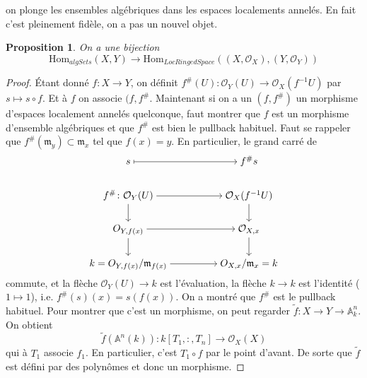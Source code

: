 \documentclass[a4paper,12pt]{book}
\newcommand{\A}{\mathbb{A}}
\newcommand{\Or}{\mathcal{O}}
\newcommand{\Hom}{\textrm{Hom}}
\newcommand{\m}{\mathfrak{m}}
\theoremstyle{plain}
\newtheorem{prop}[subsection]{Proposition}
\theoremstyle{definition}
\theoremstyle{remark}
\begin{document}
on plonge les ensembles algébriques dans les espaces localements
annelés. En fait c'est pleinement fidèle, on a pas un nouvel objet.
\begin{prop}
    On a une bijection 
    \[\Hom_{algSets}(X,Y)\to \Hom_{LocRingedSpace}((X,\Or_X),(Y,\Or_Y))\]
\end{prop}
\begin{proof}
    Étant donné $f\colon X\to Y$, on définit 
    $f^{\#}(U)\colon \Or_Y(U)\to \Or_X(f^{-1}U)$ par $s\mapsto s\circ f$.
    Et à $f$ on associe $(f,f^{\#}$. Maintenant si on a un $(f,f^{\#})$
    un morphisme d'espaces localement annelés quelconque, faut montrer
    que $f$ est un morphisme d'ensemble 
    algébriques et que $f^{\#}$ est bien le pullback habituel. Faut
    se rappeler que $f^{\#}(\m_y)\subset \m_x$ tel que $f(x)=y$. En 
    particulier, le grand carré de 
\[\begin{tikzcd}[ampersand replacement=\&,cramped]
	s \&\& {f^{\#}s} \\
	{f^{\#}\colon\mathcal O_Y(U)} \&\& {\mathcal O_X(f^{-1}U)} \\
	{O_{Y,f(x)}} \&\& {\mathcal O_{X,x}} \\
	{k=O_{Y,f(x)}/\mathfrak m_{f(x)}} \&\& {O_{X,x}/\mathfrak m_{x}=k}
	\arrow[maps to, from=1-1, to=1-3]
	\arrow[from=2-1, to=2-3]
	\arrow[from=2-1, to=3-1]
	\arrow[from=2-3, to=3-3]
	\arrow[from=3-1, to=3-3]
	\arrow[from=3-1, to=4-1]
	\arrow[from=3-3, to=4-3]
	\arrow[from=4-1, to=4-3]
\end{tikzcd}\]
    commute, et la flèche $\Or_Y(U)\to k$ est l'évaluation, la flèche
    $k\to k$ est l'identité ($1\mapsto 1$), i.e. $f^{\#}(s)(x)=s(f(x))$.
    On a montré que $f^{\#}$ est le pullback habituel. Pour montrer
    que c'est un morphisme, on peut regarder 
    $\tilde f\colon X\to Y\to \A^n_k$. On obtient 
    \[\tilde f(\A^n(k))\colon k[T_1,\colon, T_n]\to \Or_X(X)\]
    qui à $T_1$ associe $f_1$. En particulier, c'est $T_1\circ f$ par
    le point d'avant. De sorte que $\tilde f$ est défini par
    des polynômes et donc un morphisme.
\end{proof}
\end{document}
